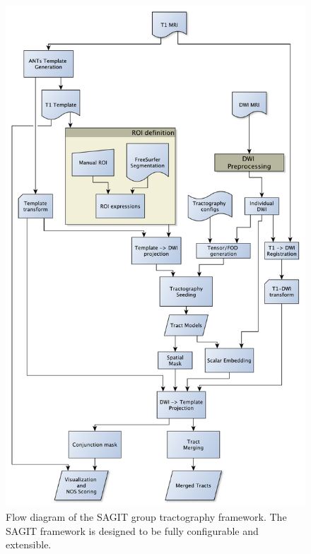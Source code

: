 \begin{figure}[p]
\centering
\includegraphics[width=140mm]{figure1.pdf}
\caption{Flow diagram of the SAGIT group tractography framework. The SAGIT framework is designed to be fully configurable and extensible.}
\label{fig:SGfigure1}
\end{figure}

